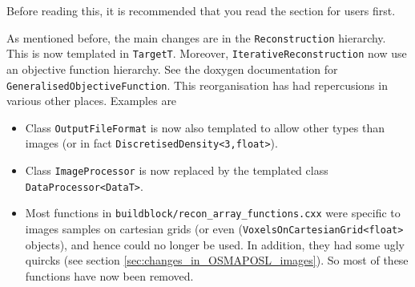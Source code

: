 \documentclass{article}
\begin{document}
Before reading this, it is recommended that you read the section for
users first.

As mentioned before, the main changes are in the \texttt{Reconstruction}
hierarchy. This is now templated in \texttt{TargetT}. Moreover,
\texttt{IterativeReconstruction} now use an objective function hierarchy. See 
the doxygen documentation for \texttt{GeneralisedObjectiveFunction}. This
reorganisation has had repercusions in various other places. Examples are
\begin{itemize}
\item Class \texttt{OutputFileFormat} is now also templated to allow
other types than images (or in fact \texttt{DiscretisedDensity<3,float>}).
\item Class \texttt{ImageProcessor} is now replaced by the templated
class \texttt{DataProcessor<DataT>}.
\item Most functions in \texttt{buildblock/recon\_array\_functions.cxx}
were specific to images samples on cartesian grids 
(or even (\texttt{VoxelsOnCartesianGrid<float>} objects), and hence
could no longer be used. In addition, they had some ugly quircks
(see section \ref{sec:changes_in_OSMAPOSL_images}). So most of these
functions have now been removed.
\end{itemize}
\end{document}
